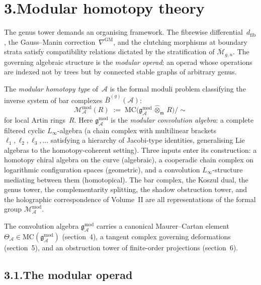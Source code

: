 \documentclass[11pt]{report}
\theoremstyle{definition}
\theoremstyle{remark}
\providecommand{\cA}{\mathcal{A}}
\providecommand{\cM}{\mathcal{M}}
\providecommand{\barB}{\bar{B}}
\numberwithin{equation}{section}
\begin{document}
\section*{3.\quad Modular homotopy theory}

The genus tower demands an organising framework. The
fibrewise differential~$d_{\mathrm{fib}}$, the Gauss--Manin
correction~$\nabla^{\mathrm{GM}}$, and the clutching morphisms at
boundary strata satisfy compatibility relations dictated by the
stratification of $\overline{\cM}_{g,n}$. The governing algebraic structure
is the \emph{modular operad}: an operad whose operations
are indexed not by trees but by connected stable graphs of
arbitrary genus.

The \emph{modular homotopy type} of~$\cA$ is the formal moduli
problem classifying the inverse system of bar complexes
$\barB^{(g)}(\cA)$:
\[
\mathcal M^{\mathrm{mod}}_\cA(R)
\;:=\;
\mathrm{MC}\!\bigl(
\mathfrak g^{\mathrm{mod}}_\cA \,\widehat\otimes_{\mathfrak m}\, R
\bigr)\big/{\sim}
\]
for local Artin rings~$R$. Here
$\mathfrak g^{\mathrm{mod}}_\cA$ is the \emph{modular convolution algebra}: a complete filtered cyclic
$L_\infty$-algebra (a chain complex with multilinear brackets $\ell_1, \ell_2, \ell_3, \ldots$ satisfying
a hierarchy of Jacobi-type identities, generalising Lie algebras
to the homotopy-coherent setting).
Three inputs enter its construction: a homotopy chiral algebra on
the curve (algebraic), a cooperadic chain complex on
logarithmic configuration spaces (geometric), and a
convolution $L_\infty$-structure mediating between them
(homotopical). The bar complex, the Koszul dual, the genus
tower, the complementarity splitting, the shadow obstruction tower,
and the holographic correspondence of Volume~II are all
representations of the formal group $\mathcal M^{\mathrm{mod}}_\cA$.

The convolution algebra $\mathfrak g^{\mathrm{mod}}_\cA$ carries a
canonical Maurer--Cartan element
$\Theta_\cA\in\mathrm{MC}(\mathfrak g^{\mathrm{mod}}_\cA)$
(section~4), a tangent complex governing deformations
(section~5), and an obstruction tower of finite-order
projections (section~6).


\subsection*{3.1.\enspace The modular operad}
\end{document}
